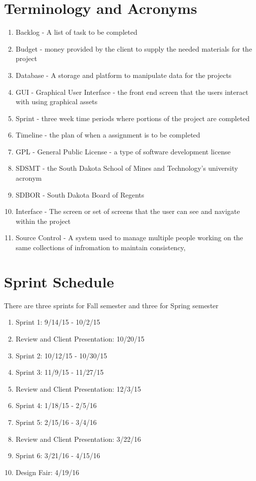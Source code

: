 \section{Terminology and Acronyms}
\begin{enumerate}
\item Backlog - A list of task to be completed
\item Budget - money provided by the client to supply the needed materials for the project
\item Database - A storage and platform to manipulate data for the projects 
\item GUI - Graphical User Interface - the front end screen that the users interact with using graphical assets
\item Sprint - three week time periods where portions of the project are completed
\item Timeline - the plan of when a assignment is to be completed
\item GPL - General Public License - a type of software development license
\item SDSMT - the South Dakota School of Mines and Technology's university acronym
\item SDBOR - South Dakota Board of Regents
\item Interface - The screen or set of screens that the user can see and navigate within the project
\item Source Control - A system used to manage multiple people working on the same collections of infromation to maintain consistency,  
\end{enumerate}

\section{Sprint Schedule}
There are three sprints for Fall semester and three for Spring semester 
\begin{enumerate}
\item Sprint 1: 9/14/15 - 10/2/15
\item Review and Client Presentation: 10/20/15
\item Sprint 2: 10/12/15 - 10/30/15
\item Sprint 3: 11/9/15 - 11/27/15
\item Review and Client Presentation: 12/3/15
\item Sprint 4: 1/18/15 - 2/5/16
\item Sprint 5: 2/15/16 - 3/4/16
\item Review and Client Presentation: 3/22/16
\item Sprint 6: 3/21/16 - 4/15/16
\item Design Fair: 4/19/16
\end{enumerate}

